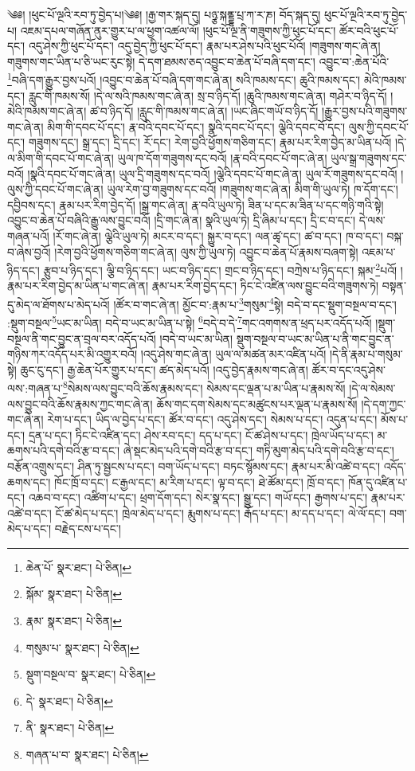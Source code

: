 \setcounter{footnote}{0} 
༄༅། །ཕུང་པོ་ལྔའི་རབ་ཏུ་བྱེད་པ།༄༅། །རྒྱ་གར་སྐད་དུ། པཉྩ་སྐནྡྷ་པྲ་ཀ་ར་ཎ། བོད་སྐད་དུ། ཕུང་པོ་ལྔའི་རབ་ཏུ་བྱེད་པ། འཇམ་དཔལ་གཞོན་ནུར་གྱུར་པ་ལ་ཕྱག་འཚལ་ལོ། །ཕུང་པོ་ལྔ་ནི་གཟུགས་ཀྱི་ཕུང་པོ་དང་། ཚོར་བའི་ཕུང་པོ་དང་། འདུ་ཤེས་ཀྱི་ཕུང་པོ་དང་། འདུ་བྱེད་ཀྱི་ཕུང་པོ་དང་། རྣམ་པར་ཤེས་པའི་ཕུང་པོའོ། །གཟུགས་གང་ཞེ་ན། གཟུགས་གང་ཡིན་པ་ཅི་ཡང་རུང་སྟེ། དེ་དག་ཐམས་ཅད་འབྱུང་བ་ཆེན་པོ་བཞི་དག་དང་། འབྱུང་བ་:ཆེན་པོའི་\footnote{ཆེན་པོ་  སྣར་ཐང་།  པེ་ཅིན། }བཞི་དག་རྒྱུར་བྱས་པའོ། །འབྱུང་བ་ཆེན་པོ་བཞི་དག་གང་ཞེ་ན། སའི་ཁམས་དང་། ཆུའི་ཁམས་དང་། མེའི་ཁམས་དང་། རླུང་གི་ཁམས་སོ། །དེ་ལ་སའི་ཁམས་གང་ཞེ་ན། སྲ་བ་ཉིད་དོ། །ཆུའི་ཁམས་གང་ཞེ་ན། གཤེར་བ་ཉིད་དོ། །མེའི་ཁམས་གང་ཞེ་ན། ཚ་བ་ཉིད་དོ། །རླུང་གི་ཁམས་གང་ཞེ་ན། །ཡང་ཞིང་གཡོ་བ་ཉིད་དོ། །རྒྱུར་བྱས་པའི་གཟུགས་གང་ཞེ་ན། མིག་གི་དབང་པོ་དང་། རྣ་བའི་དབང་པོ་དང་། སྣའི་དབང་པོ་དང་། ལྕེའི་དབང་བོ་དང་། ལུས་ཀྱི་དབང་པོ་དང་། གཟུགས་དང་། སྒྲ་དང་། དྲི་དང་། རོ་དང་། རེག་བྱའི་ཕྱོགས་གཅིག་དང་། རྣམ་པར་རིག་བྱེད་མ་ཡིན་པའོ། །དེ་ལ་མིག་གི་དབང་པོ་གང་ཞེ་ན། ཡུལ་ཁ་དོག་གཟུགས་དང་བའོ། །རྣ་བའི་དབང་པོ་གང་ཞེ་ན། ཡུལ་སྒྲ་གཟུགས་དང་བའོ། །སྣའི་དབང་པོ་གང་ཞེ་ན། ཡུལ་དྲི་གཟུགས་དང་བའོ། །ལྕེའི་དབང་པོ་གང་ཞེ་ན། ཡུལ་རོ་གཟུགས་དང་བའོ། །ལུས་ཀྱི་དབང་པོ་གང་ཞེ་ན། ཡུལ་རེག་བྱ་གཟུགས་དང་བའོ། །གཟུགས་གང་ཞེ་ན། མིག་གི་ཡུལ་ཏེ། ཁ་དོག་དང་། དབྱིབས་དང་། རྣམ་པར་རིག་བྱེད་དོ། །སྒྲ་གང་ཞེ་ན། རྣ་བའི་ཡུལ་ཏེ། ཟིན་པ་དང་མ་ཟིན་པ་དང་གཉི་གའི་སྟེ། འབྱུང་བ་ཆེན་པོ་བཞིའི་རྒྱུ་ལས་བྱུང་བའོ། །དྲི་གང་ཞེ་ན། སྣའི་ཡུལ་ཏེ། དྲི་ཞིམ་པ་དང་། དྲི་ང་བ་དང་། དེ་ལས་གཞན་པའོ། །རོ་གང་ཞེ་ན། ལྕེའི་ཡུལ་ཏེ། མངར་བ་དང་། སྐྱུར་བ་དང་། ལན་ཚྭ་དང་། ཚ་བ་དང་། ཁ་བ་དང་། བསྐ་བ་ཞེས་བྱའོ། །རེག་བྱའི་ཕྱོགས་གཅིག་གང་ཞེ་ན། ལུས་ཀྱི་ཡུལ་ཏེ། འབྱུང་བ་ཆེན་པོ་རྣམས་བཞག་སྟེ། འཇམ་པ་ཉིད་དང་། རྩུབ་པ་ཉིད་དང་། ལྕི་བ་ཉིད་དང་། ཡང་བ་ཉིད་དང་། གྲང་བ་ཉིད་དང་། བཀྲེས་པ་ཉིད་དང་། སྐམ་\footnote{སྐོམ་  སྣར་ཐང་།  པེ་ཅིན། }པའོ། །རྣམ་པར་རིག་བྱེད་མ་ཡིན་པ་གང་ཞེ་ན། རྣམ་པར་རིག་བྱེད་དང་། ཏིང་ངེ་འཛིན་ལས་བྱུང་བའི་གཟུགས་ཏེ། བསྟན་དུ་མེད་ལ་ཐོགས་པ་མེད་པའོ། །ཚོར་བ་གང་ཞེ་ན། མྱོང་བ་:རྣམ་པ་\footnote{རྣམ་  སྣར་ཐང་།  པེ་ཅིན། }གསུམ་\footnote{གསུམ་པ་  སྣར་ཐང་།  པེ་ཅིན། }སྟེ། བདེ་བ་དང་སྡུག་བསྔལ་བ་དང་། :སྡུག་བསྔལ་\footnote{སྡུག་བསྔལ་བ་  སྣར་ཐང་།  པེ་ཅིན། }ཡང་མ་ཡིན། བདེ་བ་ཡང་མ་ཡིན་པ་སྟེ། \footnote{དེ་  སྣར་ཐང་།  པེ་ཅིན། }བདེ་བ་དེ་\footnote{ནི་  སྣར་ཐང་།  པེ་ཅིན། }གང་འགགས་ན་ཕྲད་པར་འདོད་པའོ། །སྡུག་བསྔལ་ནི་གང་བྱུང་ན་བྲལ་བར་འདོད་པའོ། །བདེ་བ་ཡང་མ་ཡིན། སྡུག་བསྔལ་བ་ཡང་མ་ཡིན་པ་ནི་གང་བྱུང་ན་གཉིས་ཀར་འདོད་པར་མི་འགྱུར་བའོ། །འདུ་ཤེས་གང་ཞེ་ན། ཡུལ་ལ་མཚན་མར་འཛིན་པའོ། །དེ་ནི་རྣམ་པ་གསུམ་སྟེ། ཆུང་ངུ་དང་། རྒྱ་ཆེན་པོར་གྱུར་པ་དང་། ཚད་མེད་པའོ། །འདུ་བྱེད་རྣམས་གང་ཞེ་ན། ཚོར་བ་དང་འདུ་ཤེས་ལས་:གཞན་པ་\footnote{གཞན་པ་བ་  སྣར་ཐང་།  པེ་ཅིན། }སེམས་ལས་བྱུང་བའི་ཆོས་རྣམས་དང་། སེམས་དང་ལྡན་པ་མ་ཡིན་པ་རྣམས་སོ། །དེ་ལ་སེམས་ལས་བྱུང་བའི་ཆོས་རྣམས་ཀྱང་གང་ཞེ་ན། ཆོས་གང་དག་སེམས་དང་མཚུངས་པར་ལྡན་པ་རྣམས་སོ། །དེ་དག་ཀྱང་གང་ཞེ་ན། རེག་པ་དང་། ཡིད་ལ་བྱེད་པ་དང་། ཚོར་བ་དང་། འདུ་ཤེས་དང་། སེམས་པ་དང་། འདུན་པ་དང་། མོས་པ་དང་། དྲན་པ་དང་། ཏིང་ངེ་འཛིན་དང་། ཤེས་རབ་དང་། དད་པ་དང་། ངོ་ཚ་ཤེས་པ་དང་། ཁྲེལ་ཡོད་པ་དང་། མ་ཆགས་པའི་དགེ་བའི་རྩ་བ་དང་། ཞེ་སྡང་མེད་པའི་དགེ་བའི་རྩ་བ་དང་། གཏི་མུག་མེད་པའི་དགེ་བའི་རྩ་བ་དང་། བརྩོན་འགྲུས་དང་། ཤིན་ཏུ་སྦྱངས་པ་དང་། བག་ཡོད་པ་དང་། བཏང་སྙོམས་དང་། རྣམ་པར་མི་འཚེ་བ་དང་། འདོད་ཆགས་དང་། ཁོང་ཁྲོ་བ་དང་། ང་རྒྱལ་དང་། མ་རིག་པ་དང་། ལྟ་བ་དང་། ཐེ་ཚོམ་དང་། ཁྲོ་བ་དང་། ཁོན་དུ་འཛིན་པ་དང་། འཆབ་བ་དང་། འཚིག་པ་དང་། ཕྲག་དོག་དང་། སེར་སྣ་དང་། སྒྱུ་དང་། གཡོ་དང་། རྒྱགས་པ་དང་། རྣམ་པར་འཚེ་བ་དང་། ངོ་ཚ་མེད་པ་དང་། ཁྲེལ་མེད་པ་དང་། རྨུགས་པ་དང་། རྒོད་པ་དང་། མ་དད་པ་དང་། ལེ་ལོ་དང་། བག་མེད་པ་དང་། བརྗེད་ངས་པ་དང་། 